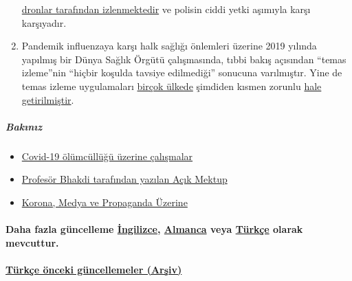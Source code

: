 \begin{enumerate}
  \href{https://off-guardian.org/2020/04/25/50-headlines-darker-more-of-the-new-normal/}{dronlar
  tarafından izlenmektedir} ve polisin ciddi yetki aşımıyla karşı
  karşıyadır.
\item
  Pandemik influenzaya karşı halk sağlığı önlemleri üzerine 2019 yılında
  yapılmış bir Dünya Sağlık Örgütü çalışmasında, tıbbi bakış açısından
  ``temas izleme''nin ``hiçbir koşulda tavsiye edilmediği'' sonucuna
  varılmıştır. Yine de temas izleme uygulamaları
  \href{https://www.technologyreview.com/2020/05/07/1001360/india-aarogya-setu-covid-app-mandatory/}{birçok
  ülkede} şimdiden kısmen zorunlu
  \href{https://www.heise.de/tp/features/CuidAR-Argentinien-ueberwacht-mit-einer-App-4720143.html}{hale
  getirilmiştir}.
\end{enumerate}

\hypertarget{-bakux131nux131z}{%
\subparagraph{\texorpdfstring{\textbf{
Bakınız}}{ Bakınız}}\label{-bakux131nux131z}}

\begin{itemize}
\tightlist
\item
  \href{https://swprs.org/studies-on-covid-19-lethality/}{Covid-19
  ölümcüllüğü üzerine çalışmalar}
\item
  \href{https://swprs.org/prof-dr-sucharit-bhakdiden-basbakan-dr-angela-merkele-acik-mektup/}{Profesör
  Bhakdi tarafından yazılan Açık Mektup}
\item
  \href{https://swprs.org/korona-medya-ve-propaganda-uezerine/}{Korona,
  Medya ve Propaganda Üzerine}
\end{itemize}

\hypertarget{daha-fazla-guxfcncelleme-ingilizce-almanca-veya-tuxfcrkuxe7e-olarak-mevcuttur}{%
\paragraph{\texorpdfstring{Daha fazla güncelleme
\href{https://swprs.org/a-swiss-doctor-on-covid-19/}{İngilizce},
\href{https://swprs.org/covid-19-hinweis-ii/}{Almanca} veya
\href{https://www.coronagercegi.com/}{Türkçe} olarak
mevcuttur.}{Daha fazla güncelleme İngilizce, Almanca veya Türkçe olarak mevcuttur.}}\label{daha-fazla-guxfcncelleme-ingilizce-almanca-veya-tuxfcrkuxe7e-olarak-mevcuttur}}

\hypertarget{tuxfcrkuxe7e-uxf6nceki-guxfcncellemeler-arux15fiv}{%
\paragraph{\texorpdfstring{\href{https://swprs.org/covid19-hakkinda-bilgiler-mart-2020-arsivi/}{Türkçe
önceki güncellemeler
(Arşiv)}}{Türkçe önceki güncellemeler (Arşiv)}}\label{tuxfcrkuxe7e-uxf6nceki-guxfcncellemeler-arux15fiv}}

